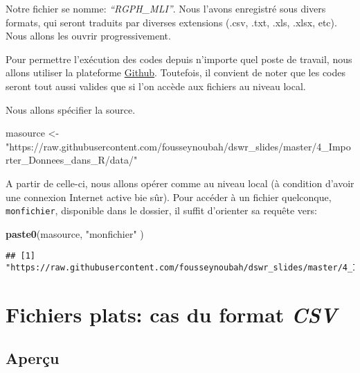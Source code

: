 \documentclass[]{book}
\newenvironment{Shaded}{\begin{snugshade}}{\end{snugshade}}
\newcommand{\KeywordTok}[1]{\textcolor[rgb]{0.13,0.29,0.53}{\textbf{#1}}}
\newcommand{\StringTok}[1]{\textcolor[rgb]{0.31,0.60,0.02}{#1}}
\newcommand{\NormalTok}[1]{#1}
\begin{document}
Notre fichier se nomme: \emph{``RGPH\_MLI''}. Nous l'avons enregistré
sous divers formats, qui seront traduits par diverses extensions (.csv,
.txt, .xls, .xlsx, etc). Nous allons les ouvrir progressivement.

Pour permettre l'exécution des codes depuis n'importe quel poste de
travail, nous allons utiliser la plateforme
\href{https://github.com/fousseynoubah/dswr_slides/tree/master/4_Importer_Donnees_dans_R/data}{Github}.
Toutefois, il convient de noter que les codes seront tout aussi valides
que si l'on accède aux fichiers au niveau local.

Nous allons spécifier la source.

\begin{Shaded}
\begin{Highlighting}[]
\NormalTok{masource <-}\StringTok{ "https://raw.githubusercontent.com/fousseynoubah/dswr_slides/master/4_Importer_Donnees_dans_R/data/"}
\end{Highlighting}
\end{Shaded}

A partir de celle-ci, nous allons opérer comme au niveau local (à
condition d'avoir une connexion Internet active bie sûr). Pour accéder à
un fichier quelconque, \texttt{monfichier}, disponible dans le dossier,
il suffit d'orienter sa requête vers:

\begin{Shaded}
\begin{Highlighting}[]
\KeywordTok{paste0}\NormalTok{(masource, }\StringTok{"monfichier"}\NormalTok{ )}
\end{Highlighting}
\end{Shaded}

\begin{verbatim}
## [1] "https://raw.githubusercontent.com/fousseynoubah/dswr_slides/master/4_Importer_Donnees_dans_R/data/monfichier"
\end{verbatim}

\section{\texorpdfstring{Fichiers plats: cas du format
\emph{CSV}}{Fichiers plats: cas du format CSV}}\label{fichiers-plats-cas-du-format-csv}

\subsection{Aperçu}\label{apercu}
\end{document}
